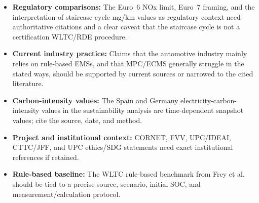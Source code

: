 \documentclass[11pt]{article}
\begin{document}
\begin{itemize}
  \item \textbf{Regulatory comparisons:} The Euro~6 NOx limit, Euro~7 framing, and the interpretation of staircase-cycle mg/km values as regulatory context need authoritative citations and a clear caveat that the staircase cycle is not a certification WLTC/RDE procedure.
  \item \textbf{Current industry practice:} Claims that the automotive industry mainly relies on rule-based EMSs, and that MPC/ECMS generally struggle in the stated ways, should be supported by current sources or narrowed to the cited literature.
  \item \textbf{Carbon-intensity values:} The Spain and Germany electricity-carbon-intensity values in the sustainability analysis are time-dependent snapshot values; cite the source, date, and method.
  \item \textbf{Project and institutional context:} CORNET, FVV, UPC/IDEAI, CTTC/JFF, and UPC ethics/SDG statements need exact institutional references if retained.
  \item \textbf{Rule-based baseline:} The WLTC rule-based benchmark from Frey et al. should be tied to a precise source, scenario, initial SOC, and measurement/calculation protocol.
\end{itemize}
\end{document}
